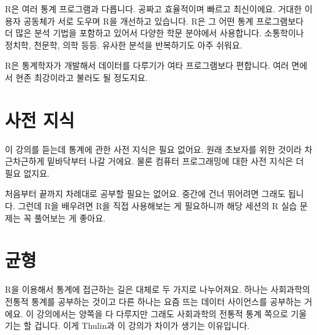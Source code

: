 \documentclass[
]{book}
\begin{document}
R은 여러 통계 프로그램과 다릅니다. 공짜고 효율적이며 빠르고 최신이에요. 거대한 이용자 공동체가 서로 도우며 R을 개선하고 있습니다. R은 그 어떤 통계 프로그램보다 더 많은 분석 기법을 포함하고 있어서 다양한 학문 분야에서 사용합니다. 소통학이나 정치학, 천문학, 의학 등등. 유사한 분석을 반복하기도 아주 쉬워요.

R은 통계학자가 개발해서 데이터를 다루기가 여타 프로그램보다 편합니다. 여러 면에서 현존 최강이라고 불러도 될 정도지요.

\hypertarget{uxc0acuxc804-uxc9c0uxc2dd}{%
\section{사전 지식}\label{uxc0acuxc804-uxc9c0uxc2dd}}

이 강의를 듣는데 통계에 관한 사전 지식은 필요 없어요. 원래 초보자를 위한 것이라 차근차근하게 밑바닥부터 나갈 거에요. 물론 컴퓨터 프로그래밍에 대한 사전 지식은 더 필요 없지요.

처음부터 끝까지 차례대로 공부할 필요는 없어요. 중간에 건너 뛰어려면 그래도 됩니다. 그런데 R을 배우려면 R을 직접 사용해보는 게 필요하니까 해당 세션의 R 실습 문제는 꼭 풀어보는 게 좋아요.

\hypertarget{uxade0uxd615}{%
\section{균형}\label{uxade0uxd615}}

R을 이용해서 통계에 접근하는 길은 대체로 두 가지로 나누어져요. 하나는 사회과학의 전통적 통계를 공부하는 것이고 다른 하나는 요즘 뜨는 데이터 사이언스를 공부하는 거에요. 이 강의에서는 양쪽을 다 다루지만 그래도 사회과학의 전통적 통계 쪽으로 기울기는 할 겁니다. 이게 Thulin과 이 강의가 차이가 생기는 이유입니다.

  
\end{document}
